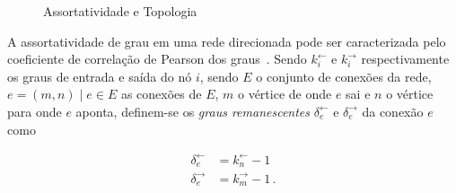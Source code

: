 \documentclass[
  article,
  11pt,
  a4paper,
  english,
  brazil,
  sumario=tradicional]{abntex2}
\begin{document}
\begin{figure}[ht]
    \centering
    \caption{Assortatividade e Topologia}
\end{figure}


A assortatividade de grau em uma rede direcionada pode ser caracterizada pelo coeficiente de correlação de Pearson dos graus~\cite{Barabasi2016-rn}. Sendo $k_i^\leftarrow$ e $k_i^\rightarrow$  respectivamente os graus de entrada e saída do nó $i$, sendo $E$ o conjunto de conexões da rede, $e = (m, n) \mid e \in E$ as conexões de $E$, $m$ o vértice de onde $e$ sai e $n$ o vértice para onde $e$ aponta, definem-se os \textit{graus remanescentes} $\delta_e^\leftarrow$ e $\delta_e^\rightarrow$ da conexão $e$ como

\begin{align*}
\delta_e^\leftarrow &= k_n^\leftarrow - 1
\\
\delta_e^\rightarrow &= k_m^\rightarrow - 1\,.
\end{align*}
\end{document}
